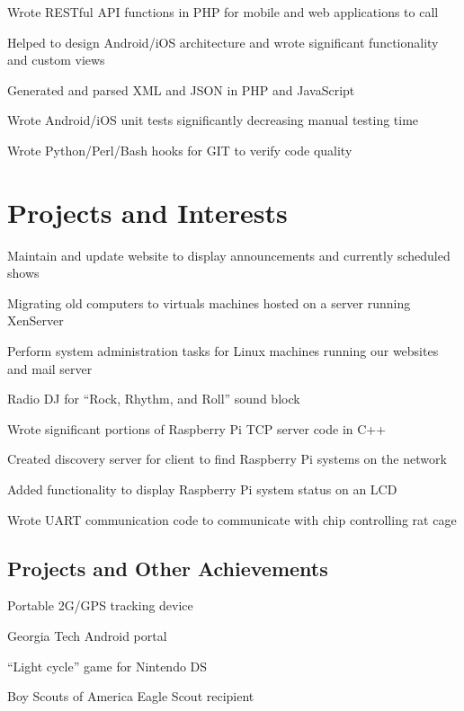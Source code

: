 \documentclass[line]{resume}
\begin{document}
\begin{myitemize}
	\item Wrote RESTful API functions in PHP for mobile and web applications to call 
	\item Helped to design Android/iOS architecture and wrote significant functionality and custom views
	\item Generated and parsed XML and JSON in PHP and JavaScript 
	\item Wrote Android/iOS unit tests significantly decreasing manual testing time 
	\item Wrote Python/Perl/Bash hooks for GIT to verify code quality
\end{myitemize}

\section{Projects and Interests}
\begin{myitemize}
	\item Maintain and update website to display announcements and currently scheduled shows 
	\item Migrating old computers to virtuals machines hosted on a server running XenServer 
	\item Perform system administration tasks for Linux machines running our websites and mail server 
	\item Radio DJ for ``Rock, Rhythm, and Roll'' sound block
\end{myitemize}

\begin{myitemize}
	\item Wrote significant portions of Raspberry Pi TCP server code in C++ 
	\item Created discovery server for client to find Raspberry Pi systems on the network 
	\item Added functionality to display Raspberry Pi system status on an LCD 
	\item Wrote UART communication code to communicate with chip controlling rat cage 
\end{myitemize}

 \subsection{Projects and Other Achievements}
\begin{compactitem}
\item Portable 2G/GPS tracking device 
\item Georgia Tech Android portal 
\item ``Light cycle'' game for Nintendo DS
\item Boy Scouts of America Eagle Scout recipient
\end{compactitem}
\end{document}
